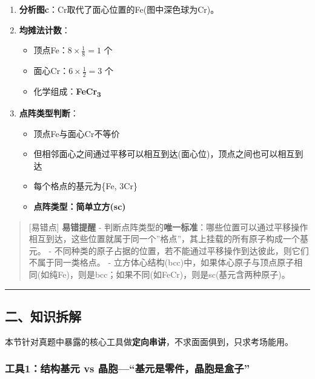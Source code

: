 \documentclass[a4paper,11pt]{ctexart}
\providecommand{\tightlist}{\setlength{\itemsep}{0pt}\setlength{\parskip}{0pt}}
\newcommand{\箭}{\ensuremath{\rightarrow}}
\newcommand{\左箭}{\ensuremath{\leftarrow}}
\newcommand{\上箭}{\ensuremath{\uparrow}}
\newcommand{\下箭}{\ensuremath{\downarrow}}
\newcommand{\衡}{\ensuremath{\rightleftharpoons}}
\newcommand{\双箭}{\ensuremath{\leftrightarrow}}
\newcommand{\约等于}{\ensuremath{\approx}}
\newcommand{\小于等于}{\ensuremath{\leq}}
\newcommand{\大于等于}{\ensuremath{\geq}}
\newcommand{\不等于}{\ensuremath{\neq}}
\newcommand{\西格马}{\ensuremath{\sigma}}
\newcommand{\派}{\ensuremath{\pi}}
\begin{document}
\begin{enumerate}
\def\labelenumi{\arabic{enumi}.}
\tightlist
\item
  \textbf{分析图c}：Cr取代了面心位置的Fe(图中深色球为Cr)。
\item
  \textbf{均摊法计数}：

  \begin{itemize}
  \tightlist
  \item
    顶点Fe：\(8 \times \frac{1}{8} = 1\) 个
  \item
    面心Cr：\(6 \times \frac{1}{2} = 3\) 个
  \item
    化学组成：\textbf{FeCr\textsubscript{3}}
  \end{itemize}
\item
  \textbf{点阵类型判断}：

  \begin{itemize}
  \tightlist
  \item
    顶点Fe与面心Cr不等价
  \item
    但相邻面心之间通过平移可以相互到达(面心位)，顶点之间也可以相互到达
  \item
    每个格点的基元为\{Fe, 3Cr\}
  \item
    \textbf{点阵类型：简单立方(sc)}
  \end{itemize}
\end{enumerate}

\begin{quote}
{[}易错点{]} \textbf{易错提醒}
- 判断点阵类型的\textbf{唯一标准}：哪些位置可以通过平移操作相互到达，这些位置就属于同一个''格点''，其上挂载的所有原子构成一个基元。
- 不同种类的原子占据的位置，若不能通过平移操作到达彼此，则它们不属于同一类格点。
- 立方体心结构(bcc)中，如果体心原子与顶点原子相同(如纯Fe)，则是bcc；如果不同(如FeCr)，则是sc(基元含两种原子)。
\end{quote}

\begin{center}\rule{0.5\linewidth}{0.5pt}\end{center}

\subsection{二、知识拆解}\label{ux4e8cux77e5ux8bc6ux62c6ux89e3-2}

本节针对真题中暴露的核心工具做\textbf{定向串讲}，不求面面俱到，只求考场能用。

\subsubsection{工具1：结构基元 vs 晶胞---``基元是零件，晶胞是盒子''}\label{ux5de5ux51771ux7ed3ux6784ux57faux5143-vs-ux6676ux80deux57faux5143ux662fux96f6ux4ef6ux6676ux80deux662fux76d2ux5b50}
\end{document}
